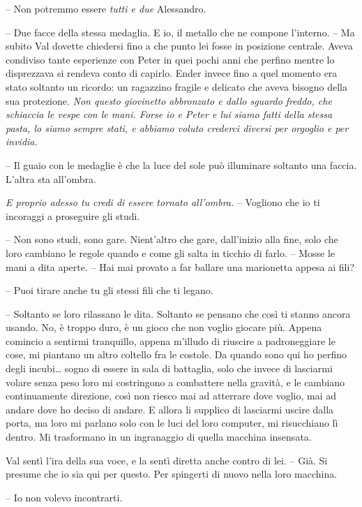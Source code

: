 {-- Non potremmo essere \emph{tutti e due} Alessandro.}

{-- Due facce della stessa medaglia. E io, il metallo che ne compone
	l'interno. -- Ma subito Val dovette chiedersi fino a che punto lei fosse
	in posizione centrale. Aveva condiviso tante esperienze con Peter in
	quei pochi anni che perfino mentre lo disprezzava si rendeva conto di
	capirlo. Ender invece fino a quel momento era stato soltanto un ricordo:
	un ragazzino fragile e delicato che aveva bisogno della sua protezione.
	\emph{Non questo giovinetto abbronzato e dallo sguardo freddo, che
		schiaccia le vespe con le mani. Forse io e Peter e lui siamo fatti della
		stessa pasta, lo siamo sempre stati, e abbiamo voluto crederci diversi
		per orgoglio e per invidia.}}

{-- Il guaio con le medaglie è che la luce del sole può illuminare
	soltanto una faccia. L'altra sta all'ombra.}

\emph{{E proprio adesso tu credi di essere tornato all'ombra. }}{--
	Vogliono che io ti incoraggi a proseguire gli studi.}

{-- Non sono studi, sono gare. Nient'altro che gare, dall'inizio alla
	fine, solo che loro cambiano le regole quando e come gli salta in
	ticchio di farlo. -- Mosse le mani a dita aperte. -- Hai mai provato a
	far ballare una marionetta appesa ai fili?}

{-- Puoi tirare anche tu gli stessi fili che ti legano.}

{-- Soltanto se loro rilassano le dita. Soltanto se pensano che così ti
	stanno ancora usando. No, è troppo duro, è un gioco che non voglio
	giocare più. Appena comincio a sentirmi tranquillo, appena m'illudo di
	riuscire a padroneggiare le cose, mi piantano un altro coltello fra le
	costole. Da quando sono qui ho perfino degli incubi\ldots{} sogno di
	essere in sala di battaglia, solo che invece di lasciarmi volare senza
	peso loro mi costringono a combattere nella gravità, e le cambiano
	continuamente direzione, così non riesco mai ad atterrare dove voglio,
	mai ad andare dove ho deciso di andare. E allora li supplico di
	lasciarmi uscire dalla porta, ma loro mi parlano solo con le luci del
	loro computer, mi risucchiano lì dentro. Mi trasformano in un
	ingranaggio di quella macchina insensata.}

{Val sentì l'ira della sua voce, e la sentì diretta anche contro di lei.
	-- Già. Si presume che io sia qui per questo. Per spingerti di nuovo
	nella loro macchina.}

{-- Io non volevo incontrarti.}

